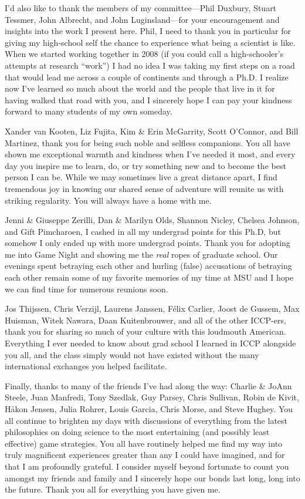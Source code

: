 \documentclass[mixedtoc]{msu-thesis-custom}
\begin{document}
I'd also like to thank the members of my committee---Phil Duxbury, Stuart
Tessmer, John Albrecht, and John Luginsland---for your encouragement and
insights into the work I present here. Phil, I need to thank you in particular
for giving my high-school self the chance to experience what being a scientist
is like. When we started working together in 2008 (if you could call a
high-schooler's attempts at research ``work'') I had no idea I was taking my
first steps on a road that would lead me across a couple of continents and
through a Ph.D. I realize now I've learned so much about the world and the
people that live in it for having walked that road with you, and I sincerely
hope I can pay your kindness forward to many students of my own someday.

Xander van Kooten, Liz Fujita, Kim \& Erin McGarrity, Scott O'Connor, and Bill
Martinez, thank you for being such noble and selfless companions. You all have
shown me exceptional warmth and kindness when I've needed it most, and every
day you inspire me to learn, do, or try something new and to become the best
person I can be. While we may sometimes live a great distance apart, I find
tremendous joy in knowing our shared sense of adventure will reunite us with
striking regularity. You will always have a home with me.

Jenni \& Giuseppe Zerilli, Dan \& Marilyn Olds, Shannon Nicley, Chelsea
Johnson, and Gift Pimcharoen, I cashed in all my undergrad points for this
Ph.D, but somehow I only ended up with more undergrad points. Thank you for
adopting me into Game Night and showing me the \emph{real} ropes of graduate
school. Our evenings spent betraying each other and hurling (false) accusations
of betraying each other remain some of my favorite memories of my time at MSU
and I hope we can find time for numerous reunions soon.

Jos Thijssen, Chris Verzijl, Laurens Janssen, F\'elix Carlier, Joost de Gussem,
Max Huisman, Witek Nawara, Daan Kuitenbrouwer, and all of the other ICCP-ers,
thank you for sharing so much of your culture with this loudmouth American.
Everything I ever needed to know about grad school I learned in ICCP alongside
you all, and the class simply would not have existed without the many 
international exchanges you helped facilitate.

Finally, thanks to many of the friends I've had along the way: Charlie \& JoAnn
Steele, Juan Manfredi, Tony Szedlak, Guy Parsey, Chris Sullivan, Robin de
Kivit, H\aa kon Jensen, Julia Rohrer, Louis Garcia, Chris Morse, and Steve
Hughey. You all continue to brighten my days with discussions of everything
from the latest philosophies on doing science to the most entertaining (and
possibly least effective) game strategies. 
\newpage
You all have routinely helped me find my way into truly magnificent experiences
greater than any I could have imagined, and for that I am profoundly grateful. I
consider myself beyond fortunate to count you amongst my friends and family and
I sincerely hope our bonds last long, long into the future. Thank you all for
everything you have given me.
\end{document}
